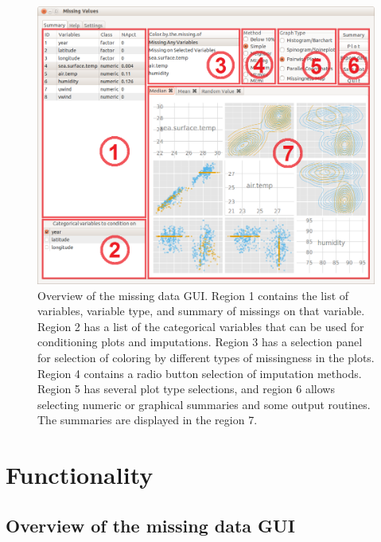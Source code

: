 \documentclass[article]{jss}
\begin{document}
\begin{center}
\begin{figure}[h]
\begin{centering}
\includegraphics[width=.9\textwidth]{graph/fig1-GUI-1-tab1}
\par\end{centering}
\caption{Overview of the missing data GUI. Region 1 contains the
list of variables, variable type, and summary of missings on that
variable. Region 2 has a list of the categorical variables that can
be used for conditioning plots and imputations. Region 3 has a
selection panel for selection of coloring by different types of
missingness in the plots. Region 4 contains a radio button selection
of imputation methods. Region 5 has several plot type selections,
and region 6 allows selecting numeric or graphical summaries and
some output routines. The summaries are displayed in the region 7.}
\label{fig:missingGUI}
\end{figure}
\par\end{center}

\section{Functionality}\label{Functionality}

\subsection{Overview of the missing data GUI}
\end{document}

